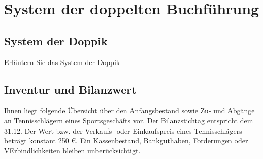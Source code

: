 \documentclass[paper=a4, fontsize=11pt]{scrartcl}
\numberwithin{equation}{section}
\numberwithin{figure}{section}
\numberwithin{table}{section}
\begin{document}

\section{System der doppelten Buchführung}


\subsection{System der Doppik}

Erläutern Sie das System der Doppik \\


\subsection{Inventur und Bilanzwert}

Ihnen liegt folgende Übersicht über den Anfangsbestand sowie Zu- und Abgänge an Tennisschlägern eines Sportsgeschäfts vor. Der Bilanzstichtag entspricht dem 31.12. Der Wert bzw. der Verkaufs- oder Einkaufspreis eines Tennisschlägers beträgt konstant 250 €. Ein Kassenbestand, Bankguthaben, Forderungen oder VErbindlichkeiten bleiben unberücksichtigt. \\
\end{document}
